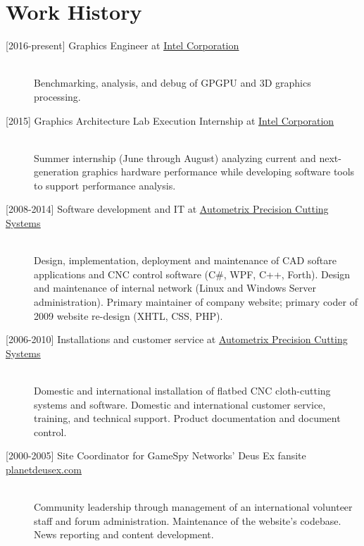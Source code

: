 \documentclass{article}
\begin{document}
	\section*{Work History}
	\begin{description}
		\item[{[}2016-present{]} Graphics Engineer at \href{http://www.intel.com/}{\ul{Intel Corporation}}] \hfill \\
		Benchmarking, analysis, and debug of GPGPU and 3D graphics processing.
		\item[{[}2015{]} Graphics Architecture Lab Execution Internship at \href{http://www.intel.com/}{\ul{Intel Corporation}}] \hfill \\
		Summer internship (June through August) analyzing current and next-generation graphics hardware performance while developing software tools to support performance analysis.
		\item[{[}2008-2014{]} Software development and IT at \href{http://www.autometrix.com/}{\ul{Autometrix Precision Cutting Systems}}] \hfill \\
		Design, implementation, deployment and maintenance of CAD softare applications and CNC control software (C\#, WPF, C++, Forth). Design and maintenance of internal network (Linux and Windows Server administration). Primary maintainer of company website; primary coder of 2009 website re-design (XHTL, CSS, PHP).
		\item[{[}2006-2010{]} Installations and customer service at \href{http://www.autometrix.com/}{\ul{Autometrix Precision Cutting Systems}}] \hfill \\
		Domestic and international installation of flatbed CNC cloth-cutting systems and software. Domestic and international customer service, training, and technical support. Product documentation and document control.
		\item[{[}2000-2005{]} Site Coordinator for GameSpy Networks' Deus Ex fansite \href{http://planetdeusex.com}{\ul{planetdeusex.com}}] \hfill \\
		Community leadership through management of an international volunteer staff and forum administration. Maintenance of the website's codebase. News reporting and content development.
	\end{description}
\end{document}
